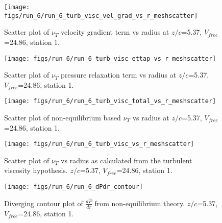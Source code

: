 \begin{figure}[H]
\centering
\texttt{[image: figs/run\_6/run\_6\_turb\_visc\_vel\_grad\_vs\_r\_meshscatter]}
\caption{Scatter plot of $\nu_T$ velocity gradient term vs radius at $z/c$=5.37, $V_{free}$=24.86, station 1.}
\end{figure}


\begin{figure}[H]
\centering
\texttt{[image: figs/run\_6/run\_6\_turb\_visc\_ettap\_vs\_r\_meshscatter]}
\caption{Scatter plot of $\nu_T$ pressure relaxation term vs radius at $z/c$=5.37, $V_{free}$=24.86, station 1.}
\end{figure}


\begin{figure}[H]
\centering
\texttt{[image: figs/run\_6/run\_6\_turb\_visc\_total\_vs\_r\_meshscatter]}
\caption{Scatter plot of non-equilibrium based $\nu_T$ vs radius at $z/c$=5.37, $V_{free}$=24.86, station 1.}
\end{figure}


\begin{figure}[H]
\centering
\texttt{[image: figs/run\_6/run\_6\_turb\_visc\_vs\_r\_meshscatter]}
\caption{Scatter plot of $\nu_T$ vs radius as calculated from the turbulent viscosity hypothesis. $z/c$=5.37, $V_{free}$=24.86, station 1.}
\end{figure}


\begin{figure}[H]
\centering
\texttt{[image: figs/run\_6/run\_6\_dPdr\_contour]}
\caption{Diverging contour plot of $\frac{d\bar{P}}{dr}$ from non-equilibrium theory. $z/c$=5.37, $V_{free}$=24.86, station 1.}
\end{figure}


